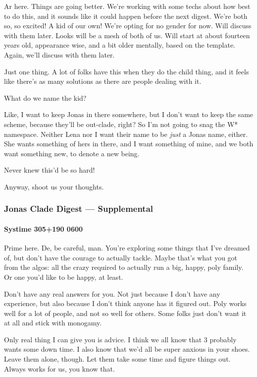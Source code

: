 Ar here. Things are going better. We're working with some techs about how best to do this, and it sounds like it could happen before the next digest. We're both so, so excited! A kid of our own! We're opting for no gender for now. Will discuss with them later. Looks will be a mesh of both of us. Will start at about fourteen years old, appearance wise, and a bit older mentally, based on the template. Again, we'll discuss with them later.

Just one thing. A lot of folks have this when they do the child thing, and it feels like there's as many solutions as there are people dealing with it.

What do we name the kid?

Like, I want to keep Jonas in there somewhere, but I don't want to keep the same scheme, because they'll be out-clade, right? So I'm not going to snag the W* namespace. Neither Lena nor I want their name to be \emph{just} a Jonas name, either. She wants something of hers in there, and I want something of mine, and we both want something new, to denote a new being.

Never knew this'd be so hard!

Anyway, shoot us your thoughts.

\hypertarget{jonas-clade-digest-supplemental}{%
\subsubsection{Jonas Clade Digest --- Supplemental}\label{jonas-clade-digest-supplemental}}

\hypertarget{systime-305190-0600}{%
\paragraph{Systime 305+190 0600}\label{systime-305190-0600}}

Prime here. De, be careful, man. You're exploring some things that I've dreamed of, but don't have the courage to actually tackle. Maybe that's what you got from the algos: all the crazy required to actually run a big, happy, poly family. Or one you'd like to be happy, at least.

Don't have any real answers for you. Not just because I don't have any experience, but also because I don't think anyone has it figured out. Poly works well for a lot of people, and not so well for others. Some folks just don't want it at all and stick with monogamy.

Only real thing I can give you is advice. I think we all know that 3 probably wants some down time. I also know that we'd all be super anxious in your shoes. Leave them alone, though. Let them take some time and figure things out. Always works for us, you know that.

